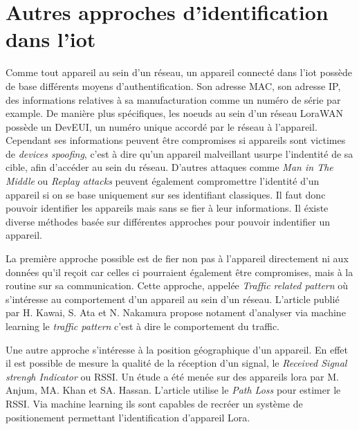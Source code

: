 \section{Autres approches d'identification dans l'iot}\label{identification}

Comme tout appareil au sein d'un réseau, un appareil connecté dans l'iot possède de base différents moyens d'authentification. Son adresse MAC, son adresse IP, des informations relatives à sa manufacturation comme un numéro de série par example. De manière plus spécifiques, les noeuds au sein d'un réseau LoraWAN possède un DevEUI, un numéro unique accordé par le réseau à l'appareil. Cependant ses informations peuvent être compromises si appareils sont victimes de \textit{devices spoofing}, c'est à dire qu'un appareil malveillant usurpe l'indentité de sa cible, afin d'accéder au sein du réseau. D'autres attaques comme \textit{Man in The Middle} ou \textit{Replay attacks} peuvent également compromettre l'identité d'un appareil si on se base uniquement sur ses identifiant classiques\cite{attack}. Il faut donc pouvoir identifier les appareils mais sans se fier à leur informations. Il éxiste diverse méthodes basée sur différentes approches pour pouvoir indentifier un appareil. 

La première approche possible est de fier non pas à l'appareil directement ni aux données qu'il reçoit car celles ci pourraient également être compromises, mais à la routine sur sa communication. Cette approche, appelée \textit{Traffic related pattern} où s'intéresse au comportement d'un appareil au sein d'un réseau. L'article publié par H. Kawai, S. Ata et N. Nakamura \cite{pattern} propose notament d'analyser via machine learning le \textit{traffic pattern} c'est à dire le comportement du traffic.

Une autre approche s'intéresse à la position géographique d'un appareil. En effet il est possible de mesure la qualité de la réception d'un signal, le \textit{Received Signal strengh Indicator} ou RSSI. Un étude a été menée sur des appareils lora par M. Anjum, MA. Khan et SA. Hassan\cite{rssi}. L'article utilise le \textit{Path Loss} pour estimer le RSSI. Via machine learning ils sont capables de recréer un système de positionement permettant l'identification d'appareil Lora.
